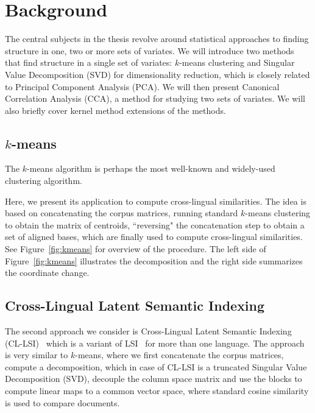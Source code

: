 %
\chapter{Background}

The central subjects in the thesis revolve around statistical approaches to finding structure in one, two or more sets of variates. We will
introduce two methods that find structure in a single set of variates: $k$-means clustering and Singular Value Decomposition (SVD) for dimensionality reduction, which is closely related to Principal Component Analysis (PCA). We will then present Canonical Correlation Analysis (CCA), a method for studying two sets of variates. We will also briefly cover kernel method extensions of the methods.


\section{$k$-means}\label{sec:kmeans}

The $k$-means algorithm is perhaps the most well-known and widely-used clustering algorithm.


Here, we present its application
to compute cross-lingual similarities. The idea is based on concatenating the corpus matrices, running standard $k$-means clustering to obtain the matrix of centroids, ``reversing" the concatenation step to obtain a set of aligned bases, which are finally used to compute cross-lingual similarities. See Figure~\ref{fig:kmeans} for overview of the procedure. The left side of Figure~\ref{fig:kmeans} illustrates the decomposition and the right side summarizes the coordinate change.

\section{Cross-Lingual Latent Semantic Indexing}\label{sec:LSI}

The second approach we consider is Cross-Lingual Latent Semantic Indexing (CL-LSI)~\cite{cl_lsi} which is a variant of LSI~\cite{lsi} for more than one language. The approach is very similar to $k$-means, where we first concatenate the corpus matrices, compute a decomposition, which in case of CL-LSI is a truncated Singular Value Decomposition (SVD), decouple the
 column space matrix and use the blocks to compute linear maps to a common vector space, where standard cosine similarity is used to compare documents.

